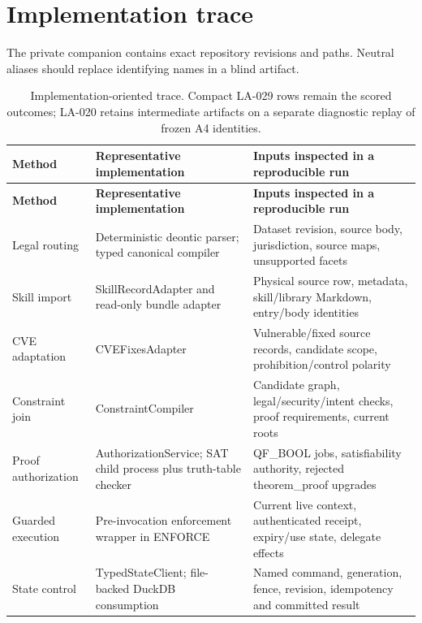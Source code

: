 \documentclass{article}
\begin{document}
\section{Implementation trace}

The private companion contains exact repository revisions and paths. Neutral aliases should replace identifying names in a blind artifact.
\begingroup
\renewcommand{\thetable}{D1}
\begin{longtable}{@{}>{\raggedright\arraybackslash}p{.24\linewidth} >{\raggedright\arraybackslash}p{.32\linewidth} >{\raggedright\arraybackslash}p{.38\linewidth}@{}}
\caption{Implementation-oriented trace. Compact LA-029 rows remain the scored outcomes; LA-020 retains intermediate artifacts on a separate diagnostic replay of frozen A4 identities.}\label{tab:D1}\\
\toprule
\textbf{Method} & \textbf{Representative implementation} & \textbf{Inputs inspected in a reproducible run} \\
\midrule
\endfirsthead
\textbf{Method} & \textbf{Representative implementation} & \textbf{Inputs inspected in a reproducible run} \\
\midrule
\endhead
\bottomrule
\endlastfoot
Legal routing & Deterministic deontic parser; typed canonical compiler & Dataset revision, source body, jurisdiction, source maps, unsupported facets \\[3pt]
Skill import & SkillRecordAdapter and read-only bundle adapter & Physical source row, metadata, skill/library Markdown, entry/body identities \\[3pt]
CVE adaptation & CVEFixesAdapter & Vulnerable/fixed source records, candidate scope, prohibition/control polarity \\[3pt]
Constraint join & ConstraintCompiler & Candidate graph, legal/security/intent checks, proof requirements, current roots \\[3pt]
Proof authorization & AuthorizationService; SAT child process plus truth-table checker & QF\_BOOL jobs, satisfiability authority, rejected theorem\_proof upgrades \\[3pt]
Guarded execution & Pre-invocation enforcement wrapper in ENFORCE & Current live context, authenticated receipt, expiry/use state, delegate effects \\[3pt]
State control & TypedStateClient; file-backed DuckDB consumption & Named command, generation, fence, revision, idempotency and committed result \\[3pt]
\end{longtable}
\endgroup
\end{document}

